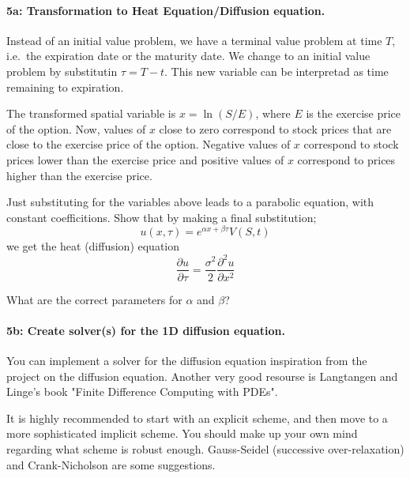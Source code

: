 \documentclass[%
oneside,                 %
final,                   %
10pt]{article}
\begin{document}
\paragraph{5a: Transformation to Heat Equation/Diffusion equation.}
Instead of an initial value problem, we have a terminal value
problem at time $T$, i.e.~the expiration date or the 
maturity date. We change to an initial value problem 
by substitutin $\tau = T - t$. This new variable can 
be interpretad as time remaining to expiration.

The transformed spatial variable is $x = \ln(S/E)$, where 
$E$ is the exercise price of the option. Now, values of 
$x$ close to zero correspond to stock prices that are close to 
the exercise price of the option. Negative values of $x$ 
correspond to stock prices lower than the exercise price and 
positive values of $x$ correspond to prices higher than the 
exercise price.

Just substituting for the variables above leads to a parabolic 
equation, with constant coefficitions. Show that by making a final
substitution;
\begin{equation}
    u(x, \tau) = e^{\alpha x + \beta \tau} V(S, t)
\end{equation}
we get the heat (diffusion) equation
\begin{equation}
    \frac{\partial u}{\partial \tau}
    = \frac{\sigma^2}{2}\frac{\partial^2 u}{\partial x^2}
\end{equation}

What are the correct parameters for $\alpha$ and $\beta$?




\paragraph{5b: Create solver(s) for the 1D diffusion equation.}
You can implement a solver for the diffusion equation 
inspiration from the project on the diffusion equation.
Another very good resourse is Langtangen and Linge's 
book "Finite Difference Computing with PDEs".

It is highly recommended to start with an explicit 
scheme, and then move to a more sophisticated 
implicit scheme. You should make up your 
own mind regarding what scheme is robust enough.
Gauss-Seidel (successive over-relaxation) and
Crank-Nicholson are some suggestions.
\end{document}
